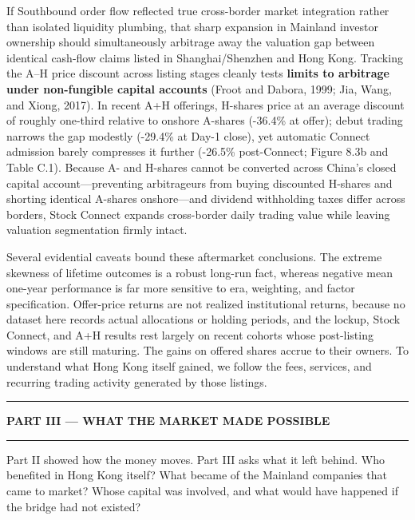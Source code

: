 \documentclass[11pt,letterpaper]{article}
\begin{document}
If Southbound order flow reflected true cross-border market integration rather than isolated liquidity plumbing, that sharp expansion in Mainland investor ownership should simultaneously arbitrage away the valuation gap between identical cash-flow claims listed in Shanghai/Shenzhen and Hong Kong. Tracking the A–H price discount across listing stages cleanly tests \textbf{limits to arbitrage under non-fungible capital accounts} (Froot and Dabora, 1999; Jia, Wang, and Xiong, 2017). In recent A+H offerings, H-shares price at an average discount of roughly one-third relative to onshore A-shares (-36.4\% at offer); debut trading narrows the gap modestly (-29.4\% at Day-1 close), yet automatic Connect admission barely compresses it further (-26.5\% post-Connect; Figure 8.3b and Table C.1). Because A- and H-shares cannot be converted across China's closed capital account—preventing arbitrageurs from buying discounted H-shares and shorting identical A-shares onshore—and dividend withholding taxes differ across borders, Stock Connect expands cross-border daily trading value while leaving valuation segmentation firmly intact.

Several evidential caveats bound these aftermarket conclusions. The extreme skewness of lifetime outcomes is a robust long-run fact, whereas negative mean one-year performance is far more sensitive to era, weighting, and factor specification. Offer-price returns are not realized institutional returns, because no dataset here records actual allocations or holding periods, and the lockup, Stock Connect, and A+H results rest largely on recent cohorts whose post-listing windows are still maturing. The gains on offered shares accrue to their owners. To understand what Hong Kong itself gained, we follow the fees, services, and recurring trading activity generated by those listings.

\par\vspace{16pt}
\noindent\rule{\linewidth}{0.85pt}\par\vspace{5pt}
{\centering\Large\bfseries\color{NavyAccent} \texorpdfstring{PART III — WHAT THE MARKET MADE POSSIBLE}{PART III — WHAT THE MARKET MADE POSSIBLE}\par}
\vspace{4pt}\noindent\rule{\linewidth}{0.85pt}\par\vspace{8pt}
Part II showed how the money moves. Part III asks what it left behind. Who benefited in Hong Kong itself? What became of the Mainland companies that came to market? Whose capital was involved, and what would have happened if the bridge had not existed?
\end{document}
